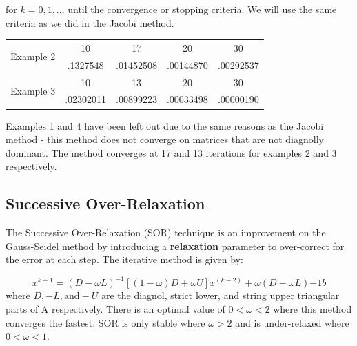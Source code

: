 \documentclass[11pt]{article}	%
\begin{document}
for $k = 0, 1, ...$ until the convergence or stopping criteria. We will use the same criteria as we did in the Jacobi method.

\begin{center}
	 \label{tab:title}
    \begin{tabular}{||c|c|c|c|c||}
        \hline
        \multirow{2}{5em}{Example 2} & 10 & 17 & 20 & 30 \\ [.25em]
        & .1327548 & .01452508 & .00144870 & .00292537 \\ [.25em]
        \hline \hline
        \multirow{2}{5em}{Example 3} & 10 & 13 & 20 & 30 \\ [.25em]
        & .02302011 & .00899223 & .00033498 & .00000190 \\ [.25em]
        \hline
    \end{tabular}
\end{center}
Examples 1 and 4 have been left out due to the same reasons as the Jacobi method - this method does not converge on matrices that are not diagnolly dominant. The method converges at 17 and 13 iterations for examples 2 and 3 respectively.

\subsection{Successive Over-Relaxation}
The Successive Over-Relaxation (SOR) technique is an improvement on the Gauss-Seidel method by introducing a \textbf{relaxation} parameter to over-correct for the error at each step. The iterative method is given by:

\begin{equation}\label{eq:successive-over-relax-eq-1}
    x^{k+1} = (D - \omega L)^{-1}[(1 - \omega)D + \omega U]x^{(k-2)} + \omega(D - \omega L){-1}b
\end{equation}
where $D, -L, \textrm{and} -U$ are the diagnol, strict lower, and string upper triangular parts of A respectively. There is an optimal value of $0 < \omega < 2$ where this method converges the fastest. SOR is only stable where $\omega > 2$ and is under-relaxed where $0 < \omega < 1$.
\end{document}
